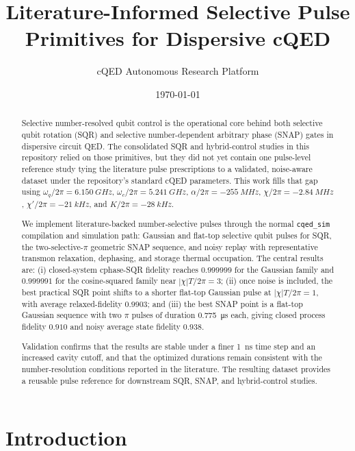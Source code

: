 \documentclass[aps,pra,twocolumn,reprint,amsmath,amssymb]{revtex4-2}
\begin{document}
\title{Literature-Informed Selective Pulse Primitives for Dispersive cQED}
\author{cQED Autonomous Research Platform}
\date{\today}

\begin{abstract}
Selective number-resolved qubit control is the operational core behind both selective qubit rotation (SQR) and selective number-dependent arbitrary phase (SNAP) gates in dispersive circuit QED. The consolidated SQR and hybrid-control studies in this repository relied on those primitives, but they did not yet contain one pulse-level reference study tying the literature pulse prescriptions to a validated, noise-aware dataset under the repository's standard cQED parameters. This work fills that gap using $\omega_q/2\pi=\SI{6.150}{GHz}$, $\omega_c/2\pi=\SI{5.241}{GHz}$, $\alpha/2\pi=\SI{-255}{MHz}$, $\chi/2\pi=\SI{-2.84}{MHz}$, $\chi'/2\pi=\SI{-21}{kHz}$, and $K/2\pi=\SI{-28}{kHz}$.

We implement literature-backed number-selective pulses through the normal \texttt{cqed\_sim} compilation and simulation path: Gaussian and flat-top selective qubit pulses for SQR, the two-selective-$\pi$ geometric SNAP sequence, and noisy replay with representative transmon relaxation, dephasing, and storage thermal occupation. The central results are: (i) closed-system cphase-SQR fidelity reaches $0.999999$ for the Gaussian family and $0.999991$ for the cosine-squared family near $|\chi|T/2\pi=3$; (ii) once noise is included, the best practical SQR point shifts to a shorter flat-top Gaussian pulse at $|\chi|T/2\pi=1$, with average relaxed-fidelity $0.9903$; and (iii) the best SNAP point is a flat-top Gaussian sequence with two $\pi$ pulses of duration \SI{0.775}{\micro s} each, giving closed process fidelity $0.910$ and noisy average state fidelity $0.938$.

Validation confirms that the results are stable under a finer \SI{1}{ns} time step and an increased cavity cutoff, and that the optimized durations remain consistent with the number-resolution conditions reported in the literature. The resulting dataset provides a reusable pulse reference for downstream SQR, SNAP, and hybrid-control studies.
\end{abstract}

\maketitle

\section{Introduction}
\end{document}
